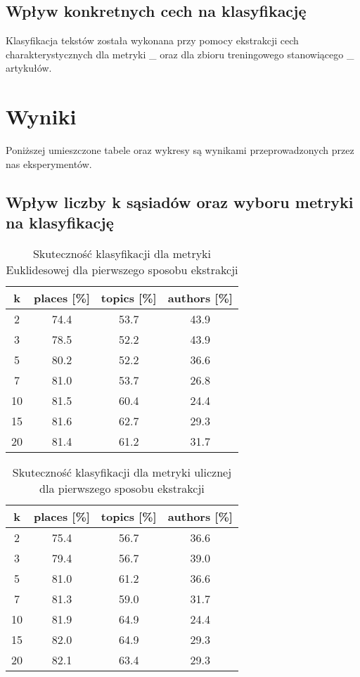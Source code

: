 \documentclass{classrep}
\begin{document}
\subsection{Wpływ konkretnych cech na klasyfikację}
Klasyfikacja tekstów została wykonana przy pomocy ekstrakcji cech charakterystycznych dla metryki \_ oraz dla zbioru treningowego stanowiącego \_ artykułów.

\section{Wyniki}

Poniższej umieszczone tabele oraz wykresy są wynikami przeprowadzonych przez nas eksperymentów.

\subsection{Wpływ liczby k sąsiadów oraz wyboru metryki na klasyfikację}

\begin{table}[H]
	\centering
	\begin{tabular}{c c c c} 
		\hline
		\textbf{k} & \textbf{places [\%]} & \textbf{topics [\%]} &  \textbf{authors [\%]} \\ [0.5ex] 
		\hline
		\hline 
		2 & 74.4 & 53.7 & 43.9 \\ 
		3 & 78.5 & 52.2 & 43.9 \\
		5 & 80.2 & 52.2 & 36.6 \\
		7 & 81.0 & 53.7 & 26.8 \\
		10 & 81.5 & 60.4 & 24.4 \\
		15 & 81.6 & 62.7 & 29.3 \\
		20 & 81.4 & 61.2 & 31.7 \\ 
		\hline
	\end{tabular}
	\caption{Skuteczność klasyfikacji dla metryki Euklidesowej dla pierwszego sposobu ekstrakcji}
\end{table}

\begin{table}[H]
	\centering
	\begin{tabular}{c c c c} 
		\hline
		\textbf{k} & \textbf{places [\%]} & \textbf{topics [\%]} &  \textbf{authors [\%]} \\ [0.5ex] 
		\hline
		\hline 
		2 & 75.4 & 56.7 & 36.6 \\ 
		3 & 79.4 & 56.7 & 39.0 \\
		5 & 81.0 & 61.2 & 36.6 \\
		7 & 81.3 & 59.0 & 31.7 \\
		10 & 81.9 & 64.9 & 24.4 \\
		15 & 82.0 & 64.9 & 29.3 \\
		20 & 82.1 & 63.4 & 29.3 \\ 
		\hline
	\end{tabular}
	\caption{Skuteczność klasyfikacji dla metryki ulicznej dla pierwszego sposobu ekstrakcji}
\end{table}
\end{document}
